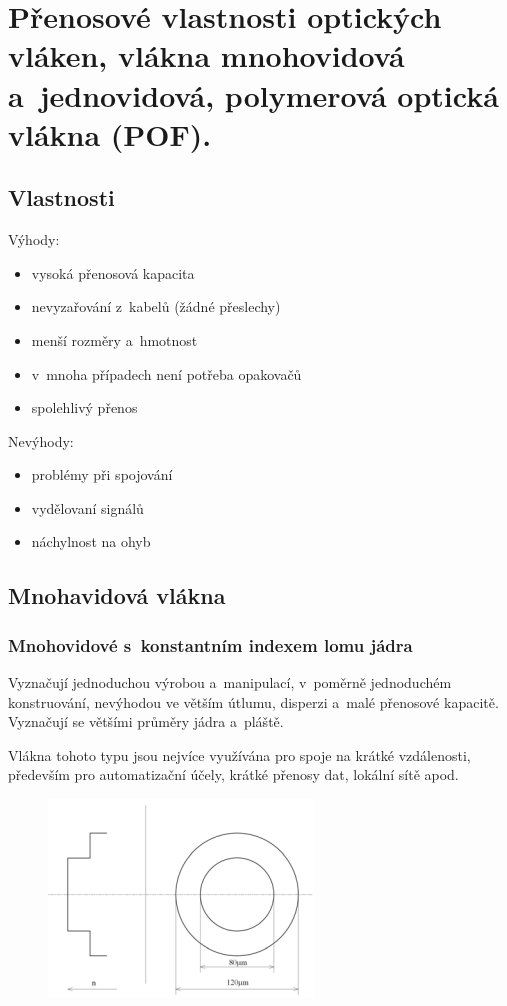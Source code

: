 \section{Přenosové vlastnosti optických vláken, vlákna mnohovidová a~jednovidová, polymerová optická vlákna (POF).}

\subsection{Vlastnosti}
Výhody:
\begin{itemize}
  \item vysoká přenosová kapacita
  \item nevyzařování z~kabelů (žádné přeslechy)
  \item menší rozměry a~hmotnost
  \item v~mnoha případech není potřeba opakovačů
  \item spolehlivý přenos
\end{itemize}
Nevýhody:
\begin{itemize}
  \item problémy při spojování
  \item vydělovaní signálů
  \item náchylnost na ohyb
\end{itemize}

\subsection{Mnohavidová vlákna}
\subsubsection{Mnohovidové s~konstantním indexem lomu jádra}
Vyznačují jednoduchou výrobou a~manipulací, v~poměrně jednoduchém konstruování, nevýhodou ve větším útlumu, disperzi a~malé přenosové kapacitě. Vyznačují se většími průměry jádra a~pláště.

Vlákna tohoto typu jsou nejvíce využívána pro spoje na krátké vzdálenosti, především pro automatizační účely, krátké přenosy dat, lokální sítě apod.

\begin{figure}[!ht]
  \begin{center}
    \includegraphics[scale=1]{obrazky/mnohavid1.png}
  \end{center}
\end{figure}

